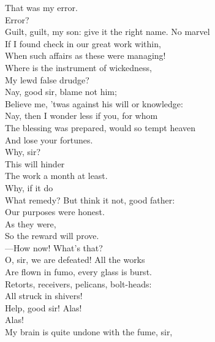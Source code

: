 \documentclass[a4paper,oneside,12pt]{memoir}
\begin{document}
\begin{drama*}
\mammonspeaks {} That was my error.\\
\subtlespeaks {} Error?\\
Guilt, guilt, my son: give it the right name. No marvel\\
If I found check in our great work within,\\
When such affairs as these were managing!\\
Where is the instrument of wickedness,\\
My lewd false drudge?\\
\mammonspeaks {} Nay, good sir, blame not him;\\
Believe me, 'twas against his will or knowledge:\\
\subtlespeaks Nay, then I wonder less if you, for whom\\
The blessing was prepared, would so tempt heaven\\
And lose your fortunes.\\
\mammonspeaks {} Why, sir?\\
\subtlespeaks {} This will hinder\\
The work a month at least.\\
\mammonspeaks {} Why, if it do\\
What remedy? But think it not, good father:\\
Our purposes were honest.\\
\subtlespeaks {} As they were,\\
So the reward will prove.\\
 ---How now! What's that?\\
\facespeaks O, sir, we are defeated! All the works\\
Are flown in fumo, every glass is burst.\\
Retorts, receivers, pelicans, bolt-heads:\\
All struck in shivers!\\
 Help, good sir! Alas!\\
\mammonspeaks Alas!\\
\facespeaks {} My brain is quite undone with the fume, sir,\\

\end{drama*}
\end{document}
